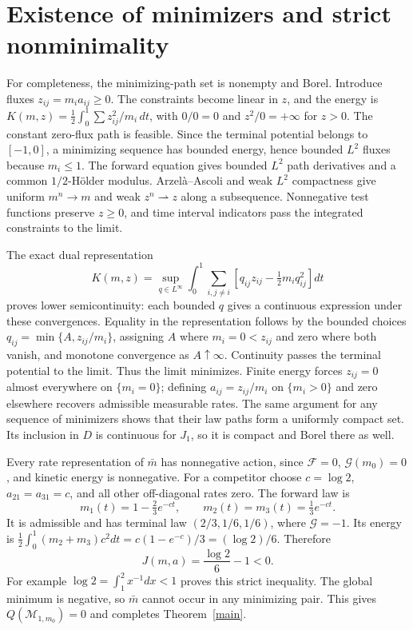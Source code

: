 \documentclass[11pt,a4paper]{article}
\begin{document}
\section{Existence of minimizers and strict nonminimality}
For completeness, the minimizing-path set is nonempty and Borel.
Introduce fluxes $z_{ij}=m_i a_{ij}\ge0$. The constraints become linear
in $z$, and the energy is
$K(m,z)=\frac12\int_0^1\sum z_{ij}^2/m_i\,dt$, with $0/0=0$ and
$z^2/0=+\infty$ for $z>0$. The constant zero-flux path is feasible.
Since the terminal potential belongs to $[-1,0]$, a minimizing sequence
has bounded energy, hence bounded $L^2$ fluxes because $m_i\le1$.
The forward equation gives bounded $L^2$ path derivatives and a common
$1/2$-H\"older modulus. Arzel\`a--Ascoli and weak $L^2$ compactness
give uniform $m^n\to m$ and weak $z^n\rightharpoonup z$ along a
subsequence. Nonnegative test functions preserve $z\ge0$, and time
interval indicators pass the integrated constraints to the limit.

The exact dual representation
\[
 K(m,z)=\sup_{q\in L^\infty}\int_0^1\sum_{i,j\ne i}
 [q_{ij}z_{ij}-\tfrac12m_iq_{ij}^2]dt
\]
proves lower semicontinuity: each bounded $q$ gives a continuous
expression under these convergences. Equality in the representation
follows by the bounded choices $q_{ij}=\min\{A,z_{ij}/m_i\}$,
assigning $A$ where $m_i=0<z_{ij}$ and zero where both vanish, and
monotone convergence as $A\uparrow\infty$. Continuity passes the
terminal potential to the limit. Thus the limit minimizes. Finite
energy forces $z_{ij}=0$ almost everywhere on $\{m_i=0\}$; defining
$a_{ij}=z_{ij}/m_i$ on $\{m_i>0\}$ and zero elsewhere recovers
admissible measurable rates. The same argument for any sequence of
minimizers shows that their law paths form a uniformly compact set.
Its inclusion in $D$ is continuous for $J_1$, so it is compact and
Borel there as well.

Every rate representation of $\bar m$ has nonnegative action, since
$\mathcal F=0$, $\mathcal G(m_0)=0$, and kinetic energy is nonnegative.
For a competitor choose $c=\log2$, $a_{21}=a_{31}=c$, and all other
off-diagonal rates zero. The forward law is
\[
 m_1(t)=1-\tfrac23e^{-ct},\qquad
 m_2(t)=m_3(t)=\tfrac13e^{-ct}.
\]
It is admissible and has terminal law $(2/3,1/6,1/6)$, where
$\mathcal G=-1$. Its energy is
$\frac12\int_0^1(m_2+m_3)c^2dt=c(1-e^{-c})/3=(\log2)/6$.
Therefore
\begin{equation}\label{strict}
 J(m,a)=\frac{\log2}{6}-1<0.
\end{equation}
For example $\log2=\int_1^2x^{-1}dx<1$ proves this strict inequality.
The global minimum is negative, so $\bar m$
cannot occur in any minimizing pair. This gives
$Q(\mathcal M_{1,m_0})=0$ and completes Theorem~\ref{main}.
\end{document}
